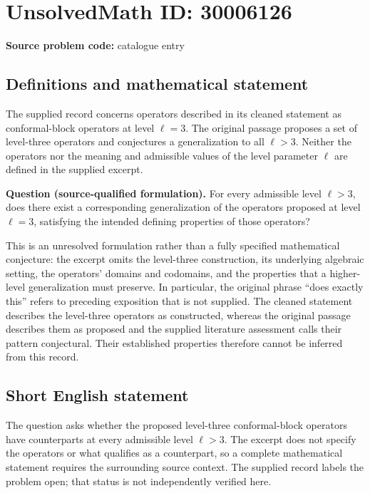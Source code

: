 \documentclass[11pt]{article}
\begin{document}
\section*{UnsolvedMath ID: 30006126}
\textbf{Source problem code:} catalogue entry
\subsection{Definitions and mathematical statement}
The supplied record concerns operators described in its cleaned statement as conformal-block operators at level \(\ell=3\). The original passage proposes a set of level-three operators and conjectures a generalization to all \(\ell>3\). Neither the operators nor the meaning and admissible values of the level parameter \(\ell\) are defined in the supplied excerpt.

\textbf{Question (source-qualified formulation).} For every admissible level \(\ell>3\), does there exist a corresponding generalization of the operators proposed at level \(\ell=3\), satisfying the intended defining properties of those operators?

This is an unresolved formulation rather than a fully specified mathematical conjecture: the excerpt omits the level-three construction, its underlying algebraic setting, the operators' domains and codomains, and the properties that a higher-level generalization must preserve. In particular, the original phrase ``does exactly this'' refers to preceding exposition that is not supplied. The cleaned statement describes the level-three operators as constructed, whereas the original passage describes them as proposed and the supplied literature assessment calls their pattern conjectural. Their established properties therefore cannot be inferred from this record.
\subsection{Short English statement}
The question asks whether the proposed level-three conformal-block operators have counterparts at every admissible level \(\ell>3\). The excerpt does not specify the operators or what qualifies as a counterpart, so a complete mathematical statement requires the surrounding source context. The supplied record labels the problem open; that status is not independently verified here.
\end{document}
